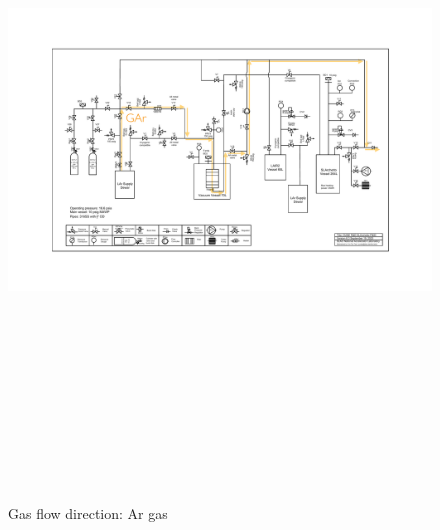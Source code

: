 \documentclass[letterpaper,11pt]{article}
\begin{document}
\begin{figure}[htb]
\begin{center}
\includegraphics[angle=90,origin=c,height=7.3in]{fig/RegenerationAr_PIDv8.3.pdf}
\caption{Gas flow direction: Ar gas}
\label{fig:ArFlow}
\end{center}
\end{figure}
\clearpage
\end{document}
